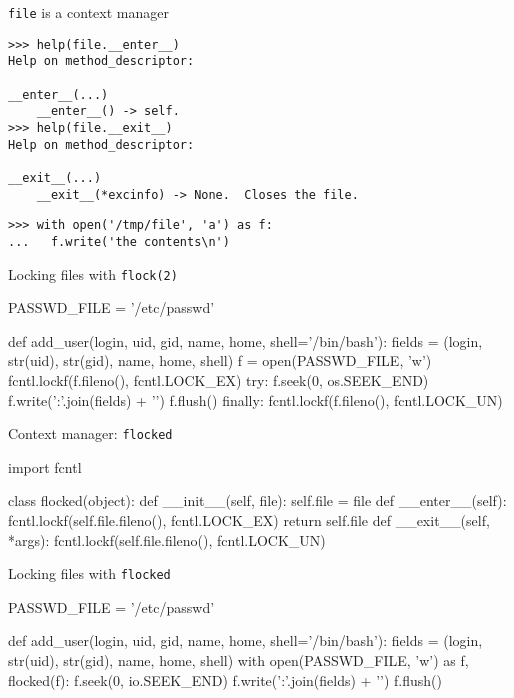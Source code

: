 \documentclass{beamer}
\begin{document}
\begin{frame}[fragile]{\texttt{file} is a context manager}
  \begin{verbatim}
>>> help(file.__enter__)
Help on method_descriptor:

__enter__(...)
    __enter__() -> self.
>>> help(file.__exit__)
Help on method_descriptor:

__exit__(...)
    __exit__(*excinfo) -> None.  Closes the file.
  \end{verbatim}
  \pause
  \begin{verbatim}
>>> with open('/tmp/file', 'a') as f:
...   f.write('the contents\n')
  \end{verbatim}
\end{frame}

\begin{frame}[fragile]{Locking files with \texttt{flock(2)}}
  \begin{pycode}
    PASSWD_FILE = '/etc/passwd'

    def add_user(login, uid, gid, name, home,
                 shell='/bin/bash'):
        fields = (login, str(uid), str(gid),
                  name, home, shell)
        f = open(PASSWD_FILE, 'w')
        fcntl.lockf(f.fileno(), fcntl.LOCK_EX)
        try:
            f.seek(0, os.SEEK_END)
            f.write(':'.join(fields) + '\n')
            f.flush()
        finally:
            fcntl.lockf(f.fileno(), fcntl.LOCK_UN)
  \end{pycode}
\end{frame}

\begin{frame}[fragile]{Context manager: \texttt{flocked}}
  \begin{pycode}
    import fcntl

    class flocked(object):
      def __init__(self, file):
         self.file = file
      def __enter__(self):
         fcntl.lockf(self.file.fileno(), fcntl.LOCK_EX)
         return self.file
      def __exit__(self, *args):
         fcntl.lockf(self.file.fileno(), fcntl.LOCK_UN)
  \end{pycode}
\end{frame}

\begin{frame}[fragile]{Locking files with \texttt{flocked}}
  \begin{pycode}
    PASSWD_FILE = '/etc/passwd'

    def add_user(login, uid, gid, name, home,
                 shell='/bin/bash'):
        fields = (login, str(uid), str(gid),
                  name, home, shell)
        with open(PASSWD_FILE, 'w') as f, flocked(f):
            f.seek(0, io.SEEK_END)
            f.write(':'.join(fields) + '\n')
            f.flush()
  \end{pycode}
\end{frame}
\end{document}
